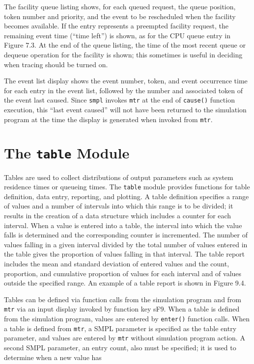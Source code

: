 The facility queue listing shows, for each queued request, the queue
position, token number and priority, and the event to be rescheduled when
the facility becomes available. If the entry represents a preempted facility
request, the remaining event time (``time left'') is shown, as for the CPU
queue entry in Figure 7.3. At the end of the queue listing, the time of the most
recent queue or dequeue operation for the facility is shown; this sometimes is
useful in deciding when tracing should be turned on.

The event list display shows the event number, token, and event
occurrence time for each entry in the event list, followed by the number and
associated token of the event last caused. Since \texttt{smpl} invokes \texttt{mtr} at the end
of \texttt{cause()} function execution, this ``last event caused'' will not have been
returned to the simulation program at the time the display is generated
when invoked from \texttt{mtr}.

\section{The \texttt{table} Module}
\label{sec:simenv-table}

Tables are used to collect distributions of output parameters such as system
residence times or queueing times. The \texttt{table} module provides functions
for table definition, data entry, reporting, and plotting. A table definition
specifies a range of values and a number of intervals into which this range is
to be divided; it results in the creation of a data structure which includes a
counter for each interval. When a value is entered into a table, the interval
into which the value falls is determined and the corresponding counter is
incremented. The number of values falling in a given interval divided by the
total number of values entered in the table gives the proportion of values
falling in that interval. The table report includes the mean and standard
deviation of entered values and the count, proportion, and cumulative
proportion of values for each interval and of values outside the specified
range. An example of a table report is shown in Figure 9.4.

Tables can be defined via function calls from the simulation program and
from \texttt{mtr} via an input display invoked by function key sF9. When a table is
defined from the simulation program, values are entered by \texttt{enter()}
function calls. When a table is defined from \texttt{mtr}, a SMPL parameter is
specified as the table entry parameter, and values are entered by \texttt{mtr}
without simulation program action. A second SMPL parameter, an entry
count, also must be specified; it is used to determine when a new value has


